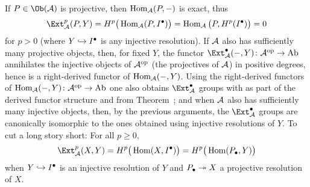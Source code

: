 \documentclass[a4paper,parskip=half,numbers=enddot, DIV=12]{scrreprt}
\begin{document}
If $P\in\Ob(\Aa)$ is projective, then $\operatorname{Hom}_{\mathcal{A}}(P,-)$ is exact, thus
\begin{align*}
	\Ext_\Aa^p(P,Y)=H^p\big(\Hom_\Aa(P,I^\bullet)\big)=\Hom_\Aa\big(P,H^p(I^\bullet)\big)=0
\end{align*}
for $p>0$ (where $Y\monomorphism I^\bullet$ is any injective resolution). If $\mathcal{A}$ also has sufficiently many projective objects, then, for fixed $Y$, the functor $\Ext_\Aa^\bullet(-,Y)\colon \Aa^\op\morphism\cat{Ab}$ annihilates the injective objects of $\mathcal{A}^{\mathrm{op}}$ (the projectives of $\mathcal{A}$) in positive degrees, hence is a right-derived functor of $\operatorname{Hom}_{\mathcal{A}}(-,Y)$. Using the right-derived functors of $\Hom_\Aa(-,Y)\colon \Aa ^\op\morphism\cat{Ab}$ one also obtains $\Ext_\Aa^\bullet$ groups with  as part of the derived functor structure and  from Theorem~; and when $\mathcal{A}$ also has sufficiently many injective objects, then, by the previous arguments, the $\Ext_\Aa^\bullet$ groups are canonically isomorphic to the ones obtained using injective resolutions of $Y$. To cut a long story short: For all $p\geq 0$,
\begin{align*}
	\Ext_\Aa^p(X,Y)=H^p\big(\Hom(X,I^\bullet)\big)=H^p\big(\Hom(P_\bullet,Y)\big)
\end{align*}
when $Y\monomorphism I^\bullet$ is an injective resolution of $Y$ and $P_\bullet\epimorphism X$ a projective resolution of $X$.
\end{document}
